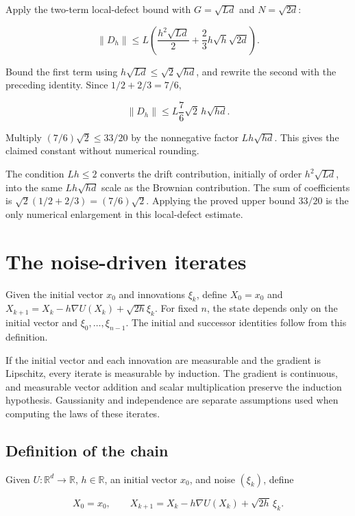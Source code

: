 \documentclass[11pt,a4paper]{article}
\begin{document}
Apply the two-term local-defect bound with \(G=\sqrt{Ld}\) and \(N=\sqrt{2d}\):

\[\|D_h\|\le L\left(\frac{h^2\sqrt{Ld}}2+\frac23h\sqrt h\sqrt{2d}\right).\]

Bound the first term using \(h\sqrt{Ld}\le\sqrt2\sqrt{hd}\), and rewrite the second with the preceding identity. Since \(1/2+2/3=7/6\),

\[\|D_h\|\le L\frac76\sqrt2\,h\sqrt{hd}.\]

Multiply \((7/6)\sqrt2\le33/20\) by the nonnegative factor \(Lh\sqrt{hd}\). This gives the claimed constant without numerical rounding.



The condition \(Lh\le2\) converts the drift contribution, initially of order \(h^2\sqrt{Ld}\), into the same \(Lh\sqrt{hd}\) scale as the Brownian contribution. The sum of coefficients is \(\sqrt2(1/2+2/3)=(7/6)\sqrt2\). Applying the proved upper bound \(33/20\) is the only numerical enlargement in this local-defect estimate.


\section{\texorpdfstring{The noise-driven iterates}{The noise-driven iterates}}


Given the initial vector \(x_0\) and innovations \(\xi_k\), define \(X_0=x_0\) and \(X_{k+1}=X_k-h\nabla U(X_k)+\sqrt{2h}\xi_k\). For fixed \(n\), the state depends only on the initial vector and \(\xi_0,\ldots,\xi_{n-1}\). The initial and successor identities follow from this definition.



If the initial vector and each innovation are measurable and the gradient is Lipschitz, every iterate is measurable by induction. The gradient is continuous, and measurable vector addition and scalar multiplication preserve the induction hypothesis. Gaussianity and independence are separate assumptions used when computing the laws of these iterates.


\subsection{\texorpdfstring{Definition of the chain}{Definition of the chain}}


Given \(U:\mathbb R^d\to\mathbb R\), \(h\in\mathbb R\), an initial vector \(x_0\), and noise \((\xi_k)\), define

\[X_0=x_0,\qquad X_{k+1}=X_k-h\nabla U(X_k)+\sqrt{2h}\,\xi_k.\]
\end{document}
